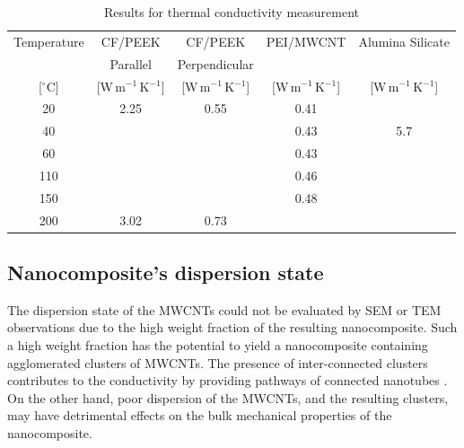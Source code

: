 \documentclass[review,times,sagev,doublespace]{sagej}
\begin{document}
\begin{table}[ht]
	\centering
	\begin{tabular}{@{}ccccc@{}}
		\toprule
		Temperature & CF/PEEK   & CF/PEEK       & PEI/MWCNT & Alumina Silicate \\
		& Parallel  & Perpendicular &           &                  \\
		{[}$^{\circ}$C{]} & {[}W\,m$^{-1}$\,K$^{-1}${]} & {[}W\,m$^{-1}$\,K$^{-1}${]}     & {[}W\,m$^{-1}$\,K$^{-1}${]} & {[}W\,m$^{-1}$\,K$^{-1}${]}        \\ \midrule
		20          & 2.25      & 0.55          & 0.41      &                  \\
		40          &           &               & {0.43}      & 5.7              \\
		60          &           &               & 0.43      &                  \\
		110         &           &               & 0.46      &                  \\
		150         &           &               & 0.48      &                  \\
		200         & 3.02      & 0.73          &           &                  \\ \bottomrule
	\end{tabular}
	\caption{Results for thermal conductivity measurement}
	\label{tab:table2}
\end{table}

\FloatBarrier

{
	\subsection{Nanocomposite's dispersion state}

The dispersion state of the MWCNTs could not be evaluated by SEM or TEM observations due to the high weight fraction of the resulting nanocomposite. 
Such a high weight fraction has the potential to yield a nanocomposite containing agglomerated clusters of MWCNTs. 
The presence of inter-connected clusters contributes to the conductivity by providing pathways of connected nanotubes \cite{Huang2012,Al-Saleh2009c}. 
On the other hand, poor dispersion of the MWCNTs, and the resulting clusters, may have detrimental effects on the bulk mechanical properties of the nanocomposite.}

\end{document}
